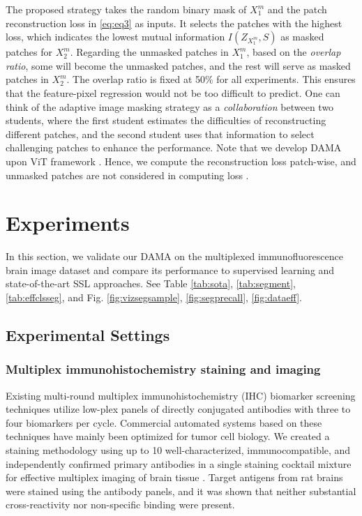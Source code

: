 \documentclass[10pt,twocolumn,letterpaper]{article}
\begin{document}
The proposed strategy takes the random binary mask of $X_1^m$ and the patch reconstruction loss in \eqref{eq:eq3} as inputs. It selects the patches with the highest loss, which indicates the lowest mutual information $I(Z_{X_1^m},S)$ as masked patches for $X_2^m$. Regarding the unmasked patches in $X_1^m$, based on the \textit{overlap ratio}, some will become the unmasked patches, and the rest will serve as masked patches in $X_2^m$. The overlap ratio is fixed at 50\% for all experiments. This ensures that the feature-pixel regression would not be too difficult to predict. One can think of the adaptive image masking strategy as a \textit{collaboration} between two students, where the first student estimates the difficulties of reconstructing different patches, and the second student uses that information to select challenging patches to enhance the performance. Note that we develop DAMA upon ViT framework \cite{vit}. Hence, we compute the reconstruction loss patch-wise, and unmasked patches are not considered in computing loss \cite{mae,data2vec,beit,simmim}. \section{Experiments}
\label{sec:exps}
In this section, we validate our DAMA on the multiplexed immunofluorescence brain image dataset and compare its performance to supervised learning and state-of-the-art SSL approaches. See Table \ref{tab:sota}, \ref{tab:segment}, \ref{tab:effclsseg}, and Fig. \ref{fig:vizsegsample}, \ref{fig:segprecall}, \ref{fig:dataeff}. 

\subsection{Experimental Settings}
\subsubsection{Multiplex immunohistochemistry staining and imaging} Existing multi-round multiplex immunohistochemistry (IHC) biomarker screening techniques utilize low-plex panels of directly conjugated antibodies with three to four biomarkers per cycle. Commercial automated systems based on these techniques have mainly been optimized for tumor cell biology. We created a staining methodology using up to 10 well-characterized, immunocompatible, and independently confirmed primary antibodies in a single staining cocktail mixture for effective multiplex imaging of brain tissue \cite{maric2021whole}. Target antigens from rat brains were stained using the antibody panels, and it was shown that neither substantial cross-reactivity nor non-specific binding were present. 
\end{document}
